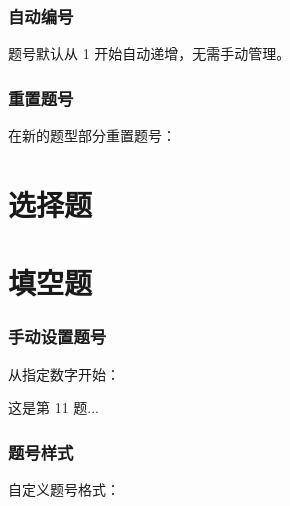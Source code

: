 \subsubsection{自动编号}

题号默认从 1 开始自动递增，无需手动管理。

\subsubsection{重置题号}

在新的题型部分重置题号：

\begin{latexcode}
  \section{选择题}
  \begin{question}
  \end{question}

  \section{填空题}
  \begin{question}
  \end{question}
\end{latexcode}

\subsubsection{手动设置题号}

从指定数字开始：

\begin{latexcode}

  \begin{question}
    这是第 11 题...
  \end{question}
\end{latexcode}

\subsubsection{题号样式}

自定义题号格式：

\begin{latexcode}
\end{latexcode}


